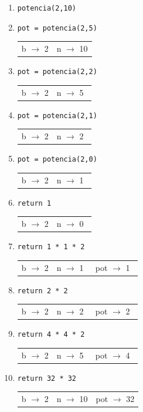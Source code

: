 \begin{enumerate}
\item \verb!potencia(2,10)! 
\item \hspace{1cm} \verb!pot = potencia(2,5) !
\hspace{4cm} \begin{tabular}{|c|c|}b $\rightarrow$ 2 & n $\rightarrow$ 10\end{tabular}
\item \hspace{2cm} \verb!pot = potencia(2,2) !
\hspace{3cm} \begin{tabular}{|c|c|}b $\rightarrow$ 2 & n $\rightarrow$ 5$\;\,$\end{tabular}
\item \hspace{3cm} \verb!pot = potencia(2,1) !
\hspace{2cm} \begin{tabular}{|c|c|}b $\rightarrow$ 2 & n $\rightarrow$ 2$\;\,$\end{tabular}
\item \hspace{4cm} \verb!pot = potencia(2,0) ! 
\hspace{1cm} \begin{tabular}{|c|c|}b $\rightarrow$ 2 & n $\rightarrow$ 1$\;\,$\end{tabular}
\item \hspace{5cm} \verb!return 1            !
\hspace{0cm} \begin{tabular}{|c|c|}b $\rightarrow$ 2 & n $\rightarrow$ 0$\;\,$\end{tabular}
\item \hspace{4cm} \verb!return 1 * 1 * 2    !
\hspace{1cm} \begin{tabular}{|c|c|c|}b $\rightarrow$ 2 & n $\rightarrow$ 1$\;\,$
& pot $\rightarrow$ 1$\;\,$ \end{tabular}
\item \hspace{3cm} \verb!return 2 * 2        !
\hspace{2cm} \begin{tabular}{|c|c|c|}b $\rightarrow$ 2 & n $\rightarrow$ 2$\;\,$
& pot $\rightarrow$ 2$\;\,$ \end{tabular}
\item \hspace{2cm} \verb!return 4 * 4 * 2    !
\hspace{3cm} \begin{tabular}{|c|c|c|}b $\rightarrow$ 2 & n $\rightarrow$ 5$\;\,$
& pot $\rightarrow$ 4$\;\,$ \end{tabular}
\item \hspace{1cm} \verb!return 32 * 32      ! 
\hspace{4cm} \begin{tabular}{|c|c|c|}b $\rightarrow$ 2 & n $\rightarrow$ 10
& pot $\rightarrow$ 32 \end{tabular}
\end{enumerate}

